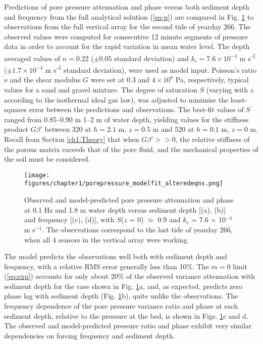 Predictions of pore pressure attenuation and phase versus both sediment depth and frequency from the full analytical solution (\ref{eq:p}) are compared in Fig. \ref{fig:seddep_all} to observations from the full vertical array for the second tide of yearday 266. The observed values were computed for consecutive 12 minute segments of pressure data in order to account for the rapid variation in mean water level. The depth averaged values of $n=0.22$ ($\pm 0.05$ standard deviation) and $k_{c}=7.6\times 10^{-4}$ m s\textsuperscript{-1} ($\pm 1.7\times 10^{-4}$ m s\textsuperscript{-1} standard deviation), were used as model input. Poisson's ratio $\nu$ and the shear modulus $G$ were set at 0.3 and $4\times 10^{8}$ Pa, respectively, typical values for a sand and gravel mixture. The degree of saturation $S$ (varying with $z$ according to the isothermal ideal gas law), was adjusted to minimise the least-squares error between the predictions and observations. The best-fit values of $S$ ranged from 0.85--0.90 in 1--2 m of water depth, yielding values for the stiffness product $G\beta'$ between 320 at $h = 2.1$ m, $z = 0.5$ m and 520 at $h = 0.1$ m, $z = 0$ m. Recall from Section \ref{ch1:Theory} that when $G\beta'>>0$, the relative stiffness of the porous matrix exceeds that of the pore fluid, and the mechanical properties of the soil must be considered.


\begin{figure} %
		\noindent\texttt{[image: figures/chapter1/porepressure\_modelfit\_alteredeqns.png]}
	\caption[Model fits to observed pore pressure response]{Observed and model-predicted pore pressure attenuation and phase at 0.1 Hz and 1.8 m water depth versus sediment depth [(a), (b)] and frequency [(c), (d)], with $S$($z$ = 0) $\simeq$ 0.9 and $k_c$ = 7.6 $\times$ 10$^{-4}$ m s$^{-1}$. The observations correspond to the last tide of yearday 266, when all 4 sensors in the vertical array were working.}
	\label{fig:seddep_all}
\end{figure}


The model predicts the observations well both with sediment depth and frequency, with a relative RMS error generally less than 10\%. The $m=0$ limit (\ref{eq:exp}) accounts for only about 20\% of the observed variance attenuation with sediment depth for the case shown in Fig. \ref{fig:seddep_all}a, and, as expected, predicts zero phase lag with sediment depth (Fig. \ref{fig:seddep_all}b), quite unlike the observations. The frequency dependence of the pore pressure variance ratio and phase at each sediment depth, relative to the pressure at the bed, is shown in Figs. \ref{fig:seddep_all}c and d. The observed and model-predicted pressure ratio and phase exhibit very similar dependencies on forcing frequency and sediment depth.


